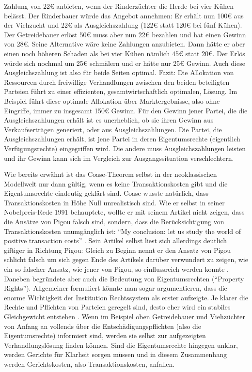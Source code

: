 Zahlung von 22€ anbieten, wenn der Rinderzüchter die Herde bei vier Kühen belässt. Der Rinderbauer würde das Angebot annehmen: Er erhält nun 100€ aus der Viehzucht und 22€ als Ausgleichszahlung (122€ statt 120€ bei fünf Kühen). Der Getreidebauer erlöst 50€ muss aber nun 22€ bezahlen und hat einen Gewinn von 28€. Seine Alternative wäre keine Zahlungen anzubieten. Dann hätte er aber einen noch höheren Schaden als bei vier Kühen nämlich 45€ statt 20€. Der Erlös würde sich nochmal um 25€ schmälern und er hätte nur 25€ Gewinn. Auch diese Ausgleichszahlung ist also für beide Seiten optimal. Fazit: Die Allokation von Ressourcen durch freiwillige Verhandlungen zwischen den beiden beteiligten Parteien führt zu einer effizienten, gesamtwirtschaftlich optimalen, Lösung.  Im Beispiel führt diese optimale Allokation über Marktergebnisse, also ohne Eingriffe, immer zu insgesamt 150€ Gewinn. Für den Gewinn jener Partei, die die Ausgleichszahlungen erhält ist es unerheblich, ob sie ihren Gewinn aus Verkaufserträgen generiert, oder aus Ausgleichszahlungen. Die Partei, die Ausgleichszahlungen erhält, ist jene Partei in deren Eigentumsrechte (eigentlich Verfügungsrechte) eingegriffen wird. Die andere muss Ausgleichszahlungen leisten und ihr Gewinn kann sich im Vergleich zur Ausgangssituation verschlechtern.

Wie bereits erwähnt ist das Coase-Theorem selbst in der neoklassischen Modellwelt nur dann gültig, wenn es keine Transaktionskosten gibt und die Eigentumsrechte eindeutig geklärt sind. Coase wusste natürlich, dass Transaktionskosten in Höhe Null unrealistisch sind. Wie er selbst in seiner Nobelpreis-Rede 1991 behauptete, wollte er mit seinem Artikel nicht zeigen, dass die Ansätze von Pigou falsch sind, sondern, dass die Berücksichtigung von Transaktionskosten unumgänglich ist: "`My conclusion: let us study the world of positive transaction costs"' \parencite{Coase1991}. Sein Artikel selbst liest sich allerdings deutlich giftiger \parencite[S. 243]{Cansier1989} in Richtung Pigou: Gleich zu Beginn nennt er den Ansatz von Pigou schlicht falsch \parencite[S. 2]{Coase1960} um sich gegen Ende des Artikels darüber verwundert zu zeigen, wie ein so falscher Ansatz, wie jener von Pigou, so einflussreich werden konnte \parencite[S. 39]{Coase1960}. Daneben begründete \textcite{Coase1960} aber auch die Bedeutung von Eigentumsrechten ("`Property Rights"').  Allgemeiner formuliert könnte man sogar argumentieren, dass \textcite{Coase1960} die enorme Wichtigkeit der Institution Rechtssystem als erster aufzeigte. Je klarer die Rechte und Pflichten von Parteien geregelt sind, desto eher wird ein stabiles Gleichgewicht entstehen \parencite[S. 19]{Coase1960}. Wenn im Beispiel oben Getreidebauer und Viehzüchter von Anfang an vollends über die Entschädigungspflichten (also die Eigentumsrechte) informiert sind, werden sie selbst zur aufgezeigten Verhandlungslösung finden können. Sind die Eigentumsrechte hingegen unklar, werden Gerichte für Klarheit sorgen müssen und in diesem Zusammenhang werden Gerichtskosten, also Transaktionskosten, anfallen. 

